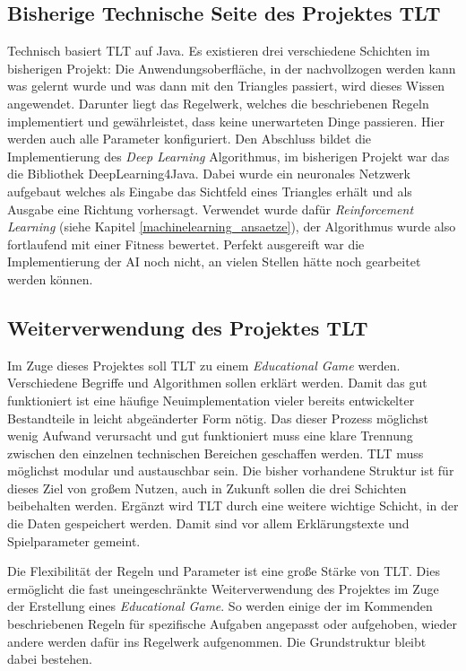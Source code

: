 \subsection{Bisherige Technische Seite des Projektes TLT}
\label{bisherigeTechnikTLT}

Technisch basiert TLT auf Java. Es existieren drei verschiedene Schichten im bisherigen Projekt: Die Anwendungsoberfläche, in der nachvollzogen werden kann was gelernt wurde und was dann mit den Triangles passiert, wird dieses Wissen angewendet. Darunter liegt das Regelwerk, welches die beschriebenen Regeln implementiert und gewährleistet, dass keine unerwarteten Dinge passieren. Hier werden auch alle Parameter konfiguriert. Den Abschluss bildet die Implementierung des \textit{Deep Learning} Algorithmus, im bisherigen Projekt war das die Bibliothek DeepLearning4Java. Dabei wurde ein neuronales Netzwerk aufgebaut welches als Eingabe das Sichtfeld eines Triangles erhält und als Ausgabe eine Richtung vorhersagt. Verwendet wurde dafür \textit{Reinforcement Learning} (siehe Kapitel \ref{machinelearning_ansaetze}), der Algorithmus wurde also fortlaufend mit einer Fitness bewertet. Perfekt ausgereift war die Implementierung der AI noch nicht, an vielen Stellen hätte noch gearbeitet werden können.

\subsection{Weiterverwendung des Projektes TLT}

Im Zuge dieses Projektes soll TLT zu einem \textit{Educational Game} werden. Verschiedene Begriffe und Algorithmen sollen erklärt werden. Damit das gut funktioniert ist eine häufige Neuimplementation vieler bereits entwickelter Bestandteile in leicht abgeänderter Form nötig. Das dieser Prozess möglichst wenig Aufwand verursacht und gut funktioniert muss eine klare Trennung zwischen den einzelnen technischen Bereichen geschaffen werden. TLT muss möglichst modular und austauschbar sein. Die bisher vorhandene Struktur ist für dieses Ziel von großem Nutzen, auch in Zukunft sollen die drei Schichten beibehalten werden. Ergänzt wird TLT durch eine weitere wichtige Schicht, in der die Daten gespeichert werden. Damit sind vor allem Erklärungstexte und Spielparameter gemeint.

Die Flexibilität der Regeln und Parameter ist eine große Stärke von TLT. Dies ermöglicht die fast uneingeschränkte Weiterverwendung des Projektes im Zuge der Erstellung eines \textit{Educational Game}. So werden einige der im Kommenden beschriebenen Regeln für spezifische Aufgaben angepasst oder aufgehoben, wieder andere werden dafür ins Regelwerk aufgenommen. Die Grundstruktur bleibt dabei bestehen.

